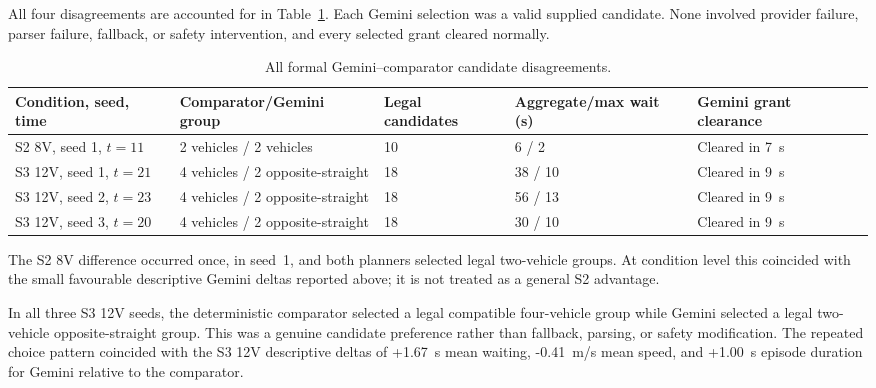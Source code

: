 \documentclass[letterpaper,10pt,conference]{ieeeconf}
\begin{document}
All four disagreements are accounted for in Table~\ref{tab:phase2_disagreements}. Each Gemini selection was a valid supplied candidate. None involved provider failure, parser failure, fallback, or safety intervention, and every selected grant cleared normally.

\begin{table}[t]

\centering

\caption{All formal Gemini--comparator candidate disagreements.}

\label{tab:phase2_disagreements}

\renewcommand{\arraystretch}{1.08}

\footnotesize

\begin{tabular}{p{2.3cm} p{2.55cm} p{1.45cm} p{2.2cm} p{2.0cm}}

\toprule

\textbf{Condition, seed, time} & \textbf{Comparator/Gemini group} & \textbf{Legal candidates} & \textbf{Aggregate/max wait (s)} & \textbf{Gemini grant clearance} \\

\midrule

S2 8V, seed 1, $t=11$ & 2 vehicles / 2 vehicles & 10 & 6 / 2 & Cleared in 7~s \\

S3 12V, seed 1, $t=21$ & 4 vehicles / 2 opposite-straight & 18 & 38 / 10 & Cleared in 9~s \\

S3 12V, seed 2, $t=23$ & 4 vehicles / 2 opposite-straight & 18 & 56 / 13 & Cleared in 9~s \\

S3 12V, seed 3, $t=20$ & 4 vehicles / 2 opposite-straight & 18 & 30 / 10 & Cleared in 9~s \\

\bottomrule

\end{tabular}

\end{table}



The S2 8V difference occurred once, in seed~1, and both planners selected legal two-vehicle groups. At condition level this coincided with the small favourable descriptive Gemini deltas reported above; it is not treated as a general S2 advantage.



In all three S3 12V seeds, the deterministic comparator selected a legal compatible four-vehicle group while Gemini selected a legal two-vehicle opposite-straight group. This was a genuine candidate preference rather than fallback, parsing, or safety modification. The repeated choice pattern coincided with the S3 12V descriptive deltas of +1.67~s mean waiting, -0.41~m/s mean speed, and +1.00~s episode duration for Gemini relative to the comparator.
\end{document}
